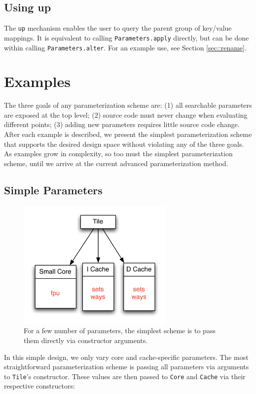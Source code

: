 \documentclass[10pt,twocolumn]{article}
\def\code#1{{\small\tt #1}}
\begin{document}
\subsection{Using up}
\label{sec::up}

The \code{up} mechanism enables the user to query the parent group of key/value mappings. It is equivalent to calling \code{Parameters.apply} directly, but can be done within calling \code{Parameters.alter}. For an example use, see Section \ref{sec::rename}.

\section{Examples}
\label{sec:examples}

The three goals of any parameterization scheme are: (1) all searchable parameters are exposed at the top level; (2) source code must never change when evaluating different points; (3) adding new parameters requires little source code change. After each example is described, we present the simplest parameterization scheme that supports the desired design space without violating any of the three goals. As examples grow in complexity, so too must the simplest parameterization scheme, until we arrive at the current advanced parameterization method.

\subsection{Simple Parameters}

\begin{figure}[h]
\centering
\includegraphics[width=3in]{figs/ex1}
\caption{For a few number of parameters, the simplest scheme is to pass them directly via constructor arguments.}
\label{fig:ex1}
\end{figure}

In this simple design, we only vary core and cache-specific parameters. The most straightforward parameterization scheme is passing all parameters via arguments to \code{Tile}'s constructor. These values are then passed to \code{Core} and \code{Cache} via their respective constructors: 
\end{document}
